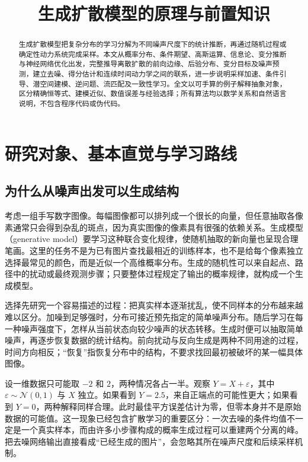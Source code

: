 \documentclass[UTF8,12pt,a4paper,fontset=fandol]{ctexart}
\title{生成扩散模型的原理与前置知识}
\author{}
\date{}
\begin{document}
\maketitle
\begin{abstract}
生成扩散模型把复杂分布的学习分解为不同噪声尺度下的统计推断，再通过随机过程或确定性动力系统完成采样。本文从概率分布、条件期望、高斯运算、信息论、变分推断与神经网络优化出发，完整推导离散扩散的前向边缘、后验分布、变分目标及噪声预测，建立去噪、得分估计和连续时间动力学之间的联系，进一步说明采样加速、条件引导、潜空间建模、逆问题、流匹配及一致性学习。全文以可手算的例子解释抽象对象，区分精确恒等式、建模近似、数值误差与经验选择；所有算法均以数学关系和自然语言说明，不包含程序代码或伪代码。
\end{abstract}
\tableofcontents

\section{研究对象、基本直觉与学习路线}
\label{sec:diff-intro}
\subsection{为什么从噪声出发可以生成结构}
考虑一组手写数字图像。每幅图像都可以排列成一个很长的向量，但任意抽取各像素通常只会得到杂乱的斑点，因为真实图像的像素具有很强的依赖关系。生成模型（generative model）要学习这种联合变化规律，使随机抽取的新向量也呈现合理笔画。这里的任务不是为已有图片查找最相近的训练样本，也不是给每个像素独立选择最常见的颜色，而是近似一个高维概率分布。生成的随机性可以来自起点、路径中的扰动或最终观测步骤；只要整体过程规定了输出的概率规律，就构成一个生成模型。

选择先研究一个容易描述的过程：把真实样本逐渐扰乱，使不同样本的分布越来越难以区分。加噪到足够强时，分布可接近预先指定的简单噪声分布。随后学习在每一种噪声强度下，怎样从当前状态向较少噪声的状态转移。生成时便可以抽取简单噪声，再逐步恢复数据的统计结构。前向扰动与反向生成是两种不同用途的过程，时间方向相反；“恢复”指恢复分布中的结构，不要求找回最初被破坏的某一幅具体图像。

设一维数据只可能取 $-2$ 和 $2$，两种情况各占一半。观察 $Y=X+\varepsilon$，其中 $\varepsilon\sim\mathcal N(0,1)$ 与 $X$ 独立。如果看到 $Y=2.5$，来自正端点的可能性更大；如果看到 $Y=0$，两种解释同样合理。此时最佳平方误差估计为零，但零本身并不是原始数据的可能值。这一现象已经包含扩散学习的重要区分：一次去噪的条件均值不一定是一个真实样本，而由许多小步骤构成的概率生成过程可以重建两个分离的峰。把去噪网络输出直接看成“已经生成的图片”，会忽略其所在噪声尺度和后续采样机制。
\end{document}

